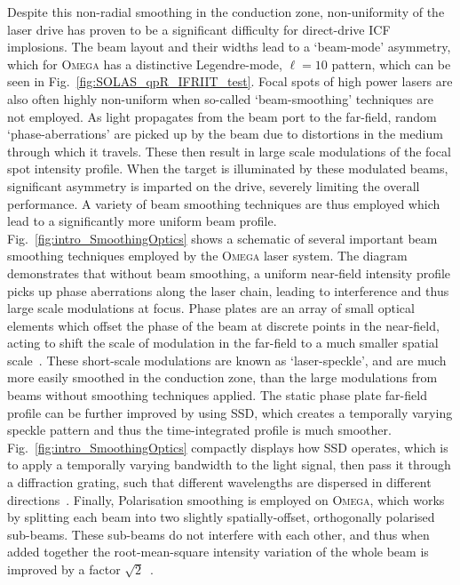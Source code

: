 Despite this non-radial smoothing in the conduction zone, non-uniformity of the laser drive has proven to be a significant difficulty for direct-drive \ac{ICF} implosions.
The beam layout and their widths lead to a `beam-mode' asymmetry, which for \textsc{Omega} has a distinctive Legendre-mode, $\ell=10$ pattern, which can be seen in Fig.~\ref{fig:SOLAS_qpR_IFRIIT_test}.
Focal spots of high power lasers are also often highly non-uniform when so-called `beam-smoothing' techniques are not employed.
As light propagates from the beam port to the far-field, random `phase-aberrations' are picked up by the beam due to distortions in the medium through which it travels.
These then result in large scale modulations of the focal spot intensity profile.
When the target is illuminated by these modulated beams, significant asymmetry is imparted on the drive, severely limiting the overall performance.
A variety of beam smoothing techniques are thus employed which lead to a significantly more uniform beam profile.
Fig.~\ref{fig:intro_SmoothingOptics} shows a schematic of several important beam smoothing techniques employed by the \textsc{Omega} laser system.
The diagram demonstrates that without beam smoothing, a uniform near-field intensity profile picks up phase aberrations along the laser chain, leading to interference and thus large scale modulations at focus.
Phase plates are an array of small optical elements which offset the phase of the beam at discrete points in the near-field, acting to shift the scale of modulation in the far-field to a much smaller spatial scale~\cite{kato_random_1984}.
These short-scale modulations are known as `laser-speckle', and are much more easily smoothed in the conduction zone, than the large modulations from beams without smoothing techniques applied.
The static phase plate far-field profile can be further improved by using \ac{SSD}, which creates a temporally varying speckle pattern and thus the time-integrated profile is much smoother.
Fig.~\ref{fig:intro_SmoothingOptics} compactly displays how \ac{SSD} operates, which is to apply a temporally varying bandwidth to the light signal, then pass it through a diffraction grating, such that different wavelengths are dispersed in different directions~\cite{skupsky_improved_1989,hohenberger_optical_2016}.
Finally, Polarisation smoothing is employed on \textsc{Omega}, which works by splitting each beam into two slightly spatially-offset, orthogonally polarised sub-beams.
These sub-beams do not interfere with each other, and thus when added together the root-mean-square intensity variation of the whole beam is improved by a factor $\sqrt{2}$~\cite{tsubakimoto_suppression_1992,boehly_reduction_1999}.

